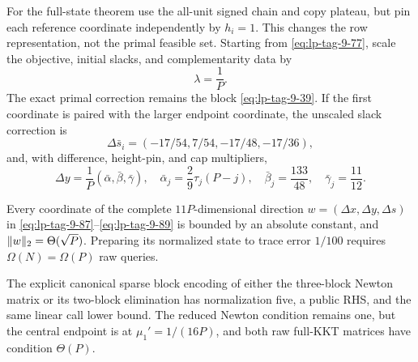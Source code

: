 For the full-state theorem use the all-unit signed chain and copy plateau, but
pin each reference coordinate independently by \(h_i=1\).  This changes the
row representation, not the primal feasible set.  Starting from
\eqref{eq:lp-tag-9-77}, scale
the objective, initial slacks, and complementarity data by
\begin{equation}
 \lambda=\frac1P.
\label{eq:lp-tag-9-87}
\end{equation}
The exact primal correction remains the block \eqref{eq:lp-tag-9-39}.  If the first coordinate
is paired with the larger endpoint coordinate, the unscaled slack correction
is
\begin{equation}
 \Delta\bar s_i=(-17/54,7/54,-17/48,-17/36),
\label{eq:lp-tag-9-88}
\end{equation}
and, with difference, height-pin, and cap multipliers,
\begin{equation}
 \Delta y=\frac1P(\bar\alpha,\bar\beta,\bar\gamma),\quad
 \bar\alpha_j=\frac29\tau_j(P-j),\quad
 \bar\beta_j=\frac{133}{48},\quad
 \bar\gamma_j=\frac{11}{12}.
\label{eq:lp-tag-9-89}
\end{equation}

\begin{theorem}
\label{thm:lp-dual-homogeneous-full}
Every coordinate of the complete \(11P\)-dimensional direction
\(w=(\Delta x,\Delta y,\Delta s)\) in
\eqref{eq:lp-tag-9-87}--\eqref{eq:lp-tag-9-89} is bounded by an
absolute constant, and \(\lVert w\rVert_2=\Theta(\sqrt P)\).  Preparing its
normalized state to trace error \(1/100\) requires
\(\Omega(N)=\Omega(P)\) raw queries.

The explicit canonical sparse block encoding of either the three-block Newton
matrix or its two-block elimination has normalization five, a public RHS, and
the same linear call lower bound.  The reduced Newton condition remains one,
but the central endpoint is at \(\mu_1'=1/(16P)\), and both raw full-KKT
matrices have condition \(\Theta(P)\).
\end{theorem}

